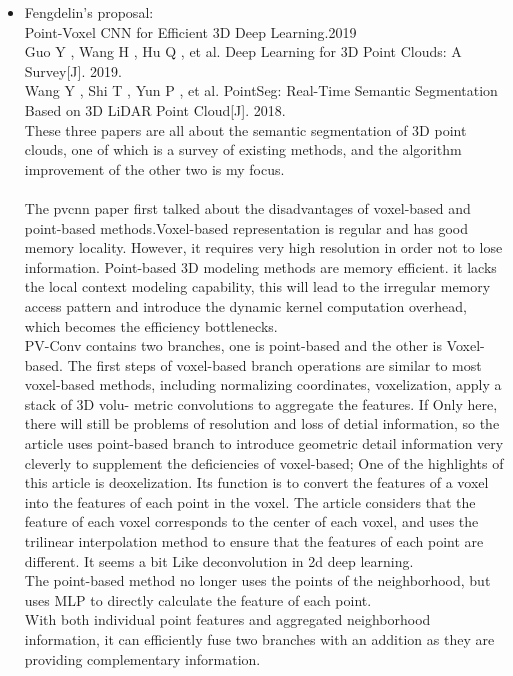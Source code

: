\documentclass{article}
\begin{document}
\begin{normalsize}
\begin{itemize}
\item Fengdelin's proposal:
\\
Point-Voxel CNN for Efficient 3D Deep Learning.2019\\
Guo Y , Wang H , Hu Q , et al. Deep Learning for 3D Point Clouds: A Survey[J]. 2019.\\
Wang Y , Shi T , Yun P , et al. PointSeg: Real-Time Semantic Segmentation Based on 3D LiDAR Point Cloud[J]. 2018.\\
These three papers are all about the semantic segmentation of 3D point clouds, one of which is a survey of existing methods, and the algorithm improvement of the other two is my focus.\\
\\
The pvcnn paper first talked about the disadvantages of voxel-based and point-based methods.Voxel-based representation is regular and has good memory locality. However, it requires very high resolution in order not to lose information. Point-based 3D modeling methods are memory efficient. it lacks the local context modeling capability, this will lead to the irregular memory access pattern and introduce the dynamic kernel computation overhead, which becomes the efficiency bottlenecks.\\
PV-Conv contains two branches, one is point-based and the other is Voxel-based.
The first steps of voxel-based branch operations are similar to most voxel-based methods, including normalizing coordinates, voxelization, apply a stack of 3D volu- metric convolutions to aggregate the features. If Only here, there will still be problems of resolution and loss of detial information, so the article uses point-based branch to introduce geometric detail information very cleverly to supplement the deficiencies of voxel-based;
One of the highlights of this article is deoxelization. Its function is to convert the features of a voxel into the features of each point in the voxel. The article considers that the feature of each voxel corresponds to the center of each voxel, and uses the trilinear interpolation method to ensure that the features of each point are different. It seems a bit Like deconvolution in 2d deep learning.\\
The point-based method no longer uses the points of the neighborhood, but uses MLP to directly calculate the feature of each point.\\
With both individual point features and aggregated neighborhood information, it can efficiently fuse two branches with an addition as they are providing complementary information.\\

\end{itemize}
\end{normalsize}
\end{document}
